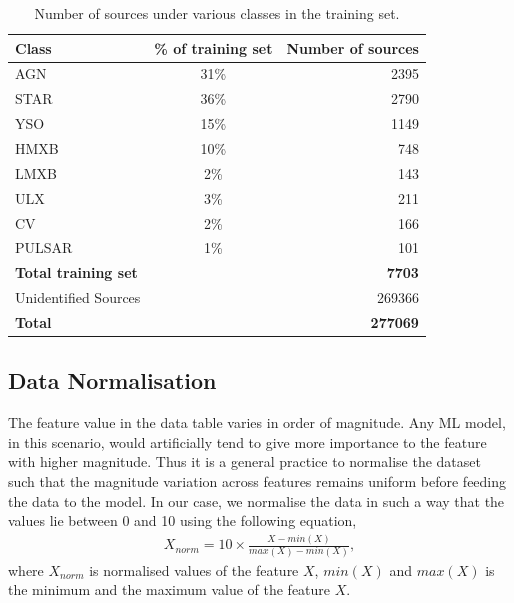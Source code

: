 \documentclass[fleqn,usenatbib]{mnras}
\begin{document}
       \begin{table}
        \centering
        \caption{Number of sources under various classes in the training set.}
        \label{tab:train-set}
\begin{tabular}{lcr}
\hline
\textbf{Class}              & \textbf{\% of training set} & \textbf{Number of sources} \\ \hline
AGN                         & 31\%                        & 2395                       \\
STAR                        & 36\%                        & 2790                       \\
YSO                         & 15\%                        & 1149                       \\
HMXB                        & 10\%                        & 748                        \\
LMXB                        & 2\%                         & 143                        \\
ULX                         & 3\%                         & 211                        \\
CV                          & 2\%                         & 166                        \\
PULSAR                      & 1\%                         & 101                        \\
\textbf{Total training set} &                             & \textbf{7703}              \\ \hline
Unidentified Sources        &                             & 269366                     \\
\textbf{Total}              &                             & \textbf{277069}            \\ \hline
\end{tabular}
    \end{table}
    \subsection{Data Normalisation}
    The feature value in the data table varies in order of magnitude. Any ML model, in this scenario, would artificially tend to give more importance to the feature with higher magnitude. Thus it is a general practice to normalise the dataset such that the magnitude variation across features remains uniform before feeding the data to the model. In our case, we normalise the data in such a way that the values lie between 0 and 10 using the following equation,
    \begin{align}
        X_{norm} = 10\times \frac{X-min(X)}{max(X)-min(X)},
    \end{align}
    where $X_{norm}$ is normalised values of the feature $X$, $min(X)$ and $max(X)$ is the minimum and the maximum value of the feature $X$.
\end{document}
